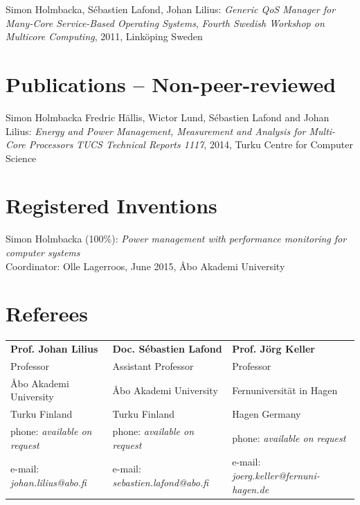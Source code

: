 \documentclass[margin,line]{resume}
\begin{document}
\begin{resume}
Simon Holmbacka, S\'{e}bastien Lafond, Johan Lilius: 
\textit{Generic QoS Manager for Many-Core Service-Based Operating Systems}, 
\textsl{Fourth Swedish Workshop on Multicore Computing}, 2011, Link\"{o}ping Sweden

\section{\mysidestyle Publications -- Non-peer-reviewed}
Simon Holmbacka Fredric H\"{a}llis, Wictor Lund, S\'{e}bastien Lafond and Johan Lilius:
\textit{Energy and Power Management, Measurement and Analysis for Multi-Core Processors} 
\textsl{TUCS Technical Reports 1117}, 2014, Turku Centre for Computer Science 

\section{\mysidestyle Registered Inventions}
Simon Holmbacka (100\%):
\textit{Power management with performance monitoring for computer systems}\\Coordinator: Olle Lagerroos, June 2015, \AA{}bo Akademi University

\section{\mysidestyle Referees} 

\begin{tabular}{@{}p{4.5cm}p{5cm}p{6cm}}
\textbf{Prof. Johan Lilius}       &  \textbf{Doc. S\'{e}bastien Lafond}	&  \textbf{Prof. J\"{o}rg Keller}                   \\
Professor                               &  Assistant Professor & Professor                       \\
\AA{}bo Akademi University                     &  \AA{}bo Akademi University   & Fernuniversit\"{a}t in Hagen                   \\
Turku Finland			           &  Turku Finland        & Hagen Germany\\
phone: \textsl{available on request}    &  phone: \textsl{available on request}  &  phone: \textsl{available on request}      \\
e-mail: \textsl{johan.lilius@abo.fi}   &  e-mail: \textsl{sebastien.lafond@abo.fi}  &  e-mail: \textsl{joerg.keller@fernuni-hagen.de}   \\
\end{tabular}


\end{resume}
\end{document}
